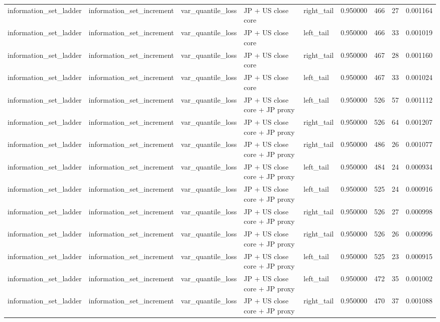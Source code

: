 \begin{tabular}{lllllrrrr}
information\_set\_ladder & information\_set\_increment & var\_quantile\_loss & JP + US close core & right\_tail & 0.950000 & 466 & 27 & 0.001164 \\
information\_set\_ladder & information\_set\_increment & var\_quantile\_loss & JP + US close core & left\_tail & 0.950000 & 466 & 33 & 0.001019 \\
information\_set\_ladder & information\_set\_increment & var\_quantile\_loss & JP + US close core & right\_tail & 0.950000 & 467 & 28 & 0.001160 \\
information\_set\_ladder & information\_set\_increment & var\_quantile\_loss & JP + US close core & left\_tail & 0.950000 & 467 & 33 & 0.001024 \\
information\_set\_ladder & information\_set\_increment & var\_quantile\_loss & JP + US close core + JP proxy & left\_tail & 0.950000 & 526 & 57 & 0.001112 \\
information\_set\_ladder & information\_set\_increment & var\_quantile\_loss & JP + US close core + JP proxy & right\_tail & 0.950000 & 526 & 64 & 0.001207 \\
information\_set\_ladder & information\_set\_increment & var\_quantile\_loss & JP + US close core + JP proxy & right\_tail & 0.950000 & 486 & 26 & 0.001077 \\
information\_set\_ladder & information\_set\_increment & var\_quantile\_loss & JP + US close core + JP proxy & left\_tail & 0.950000 & 484 & 24 & 0.000934 \\
information\_set\_ladder & information\_set\_increment & var\_quantile\_loss & JP + US close core + JP proxy & left\_tail & 0.950000 & 525 & 24 & 0.000916 \\
information\_set\_ladder & information\_set\_increment & var\_quantile\_loss & JP + US close core + JP proxy & right\_tail & 0.950000 & 526 & 27 & 0.000998 \\
information\_set\_ladder & information\_set\_increment & var\_quantile\_loss & JP + US close core + JP proxy & right\_tail & 0.950000 & 526 & 26 & 0.000996 \\
information\_set\_ladder & information\_set\_increment & var\_quantile\_loss & JP + US close core + JP proxy & left\_tail & 0.950000 & 525 & 23 & 0.000915 \\
information\_set\_ladder & information\_set\_increment & var\_quantile\_loss & JP + US close core + JP proxy & left\_tail & 0.950000 & 472 & 35 & 0.001002 \\
information\_set\_ladder & information\_set\_increment & var\_quantile\_loss & JP + US close core + JP proxy & right\_tail & 0.950000 & 470 & 37 & 0.001088 \\

\end{tabular}
